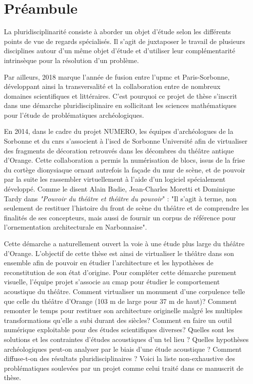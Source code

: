 \chapter*{Préambule}
	
	
			
La pluridisciplinarité consiste à aborder un objet d'étude selon les différents points de vue de regards spécialisés. Il s'agit de juxtaposer le travail de plusieurs disciplines autour d'un même objet d'étude et d'utiliser leur complémentarité intrinsèque pour la résolution d'un problème. 

Par ailleurs, 2018 marque l'année de fusion entre l'\gls{upmc} et Paris-Sorbonne, développant ainsi la transversalité et la collaboration entre de nombreux domaines scientifiques et littéraires. C'est pourquoi ce projet de thèse s'inscrit dans une démarche pluridisciplinaire en sollicitant les sciences mathématiques pour l'étude de problématiques archéologiques.
						
En 2014, dans le cadre du projet NUMERO, les équipes d'archéologues de la Sorbonne et du \gls{cnrs} s'associent à l'\gls{iscd} de Sorbonne Université afin de virtualiser des fragments de décoration retrouvés dans les décombres du théâtre antique d'Orange. Cette collaboration a permis la numérisation de blocs, issus de la frise du cortège dionysiaque ornant autrefois la façade du mur de scène, et de pouvoir par la suite les rassembler virtuellement à l'aide d'un logiciel spécialement développé. Comme le disent Alain Badie, Jean-Charles Moretti et Dominique Tardy dans \textit{"Pouvoir du théâtre et théâtre du pouvoir}" : "Il s'agit à terme, non seulement de restituer l'histoire du front de scène du théâtre et de comprendre les finalités de ses concepteurs, mais aussi de fournir un corpus de référence pour l'ornementation architecturale en Narbonnaise".
			
Cette démarche a naturellement ouvert la voie à une étude plus large du théâtre d'Or\-ange. L'objectif de cette thèse est ainsi de virtualiser le théâtre dans son ensemble afin de pouvoir en étudier l'architecture et les hypothèses de reconstitution de son état d'origine. Pour compléter cette démarche purement visuelle, l'équipe projet s'associe au \gls{cmap} pour étudier le comportement acoustique du théâtre. Comment virtualiser un monument d'une corpulence telle que celle du théâtre d'Orange (103 m de large pour 37 m de haut)? Comment remonter le temps pour restituer son architecture originelle malgré les multiples transformations qu'elle a subi durant des siècles? Comment en faire un outil numérique exploitable pour des études scientifiques diverses? Quelles sont les solutions et les contraintes d'études acoustiques d'un tel lieu ? Quelles hypothèses archéologiques peut-on analyser par le biais d'une étude acoustique ? Comment diffuse-t-on des résultats pluridisciplinaires ? Voici la liste non-exhaustive des problématiques soulevées par un projet comme celui traité dans ce manuscrit de thèse. 
			
